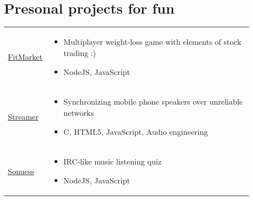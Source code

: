 \documentclass[a4paper]{article}
\makeatletter
\newlength{\tablewidth}
\newenvironment{skills}{%
\setlength{\tablewidth}{\linewidth}
\addtolength{\tablewidth}{-2\tabcolsep}
\begin{tabular}{@{}p{0.15\tablewidth}p{0.85\tablewidth}@{}}
}{%
\end{tabular}
}
\makeatother
\begin{document}
\section{Presonal projects for fun}
\begin{skills}
    \href{https://github.com/agrbin/fitmarket}{FitMarket} &
    \begin{itemize}
        \item Multiplayer weight-loss game with elements of stock trading :)
        \item NodeJS, JavaScript
    \end{itemize} \\
    \href{https://github.com/agrbin/streamer}{Streamer} &
    \begin{itemize}
        \item Synchronizing mobile phone speakers over unreliable networks
        \item C, HTML5, JavaScript, Audio engineering
    \end{itemize} \\
    \href{https://github.com/agrbin/songuess}{Sonuess} &
    \begin{itemize}
        \item IRC-like music listening quiz
        \item NodeJS, JavaScript
    \end{itemize} \\
\end{skills}
\end{document}
